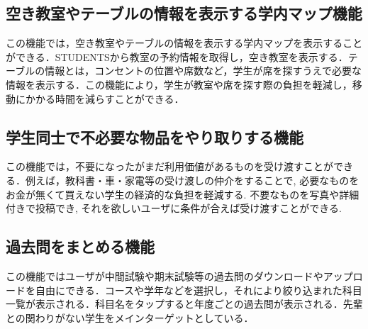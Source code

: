 \subsection{空き教室やテーブルの情報を表示する学内マップ機能}
この機能では，空き教室やテーブルの情報を表示する学内マップを表示することができる．STUDENTSから教室の予約情報を取得し，空き教室を表示する．テーブルの情報とは，コンセントの位置や席数など，学生が席を探すうえで必要な情報を表示する．この機能により，学生が教室や席を探す際の負担を軽減し，移動にかかる時間を減らすことができる．

\subsection{学生同士で不必要な物品をやり取りする機能}
この機能では，不要になったがまだ利用価値があるものを受け渡すことができる．例えば，教科書・車・家電等の受け渡しの仲介をすることで, 必要なものをお金が無くて買えない学生の経済的な負担を軽減する. 不要なものを写真や詳細付きで投稿でき, それを欲しいユーザに条件が合えば受け渡すことができる. 

\subsection{過去問をまとめる機能}
この機能ではユーザが中間試験や期末試験等の過去問のダウンロードやアップロードを自由にできる．コースや学年などを選択し，それにより絞り込まれた科目一覧が表示される．科目名をタップすると年度ごとの過去問が表示される．先輩との関わりがない学生をメインターゲットとしている．


